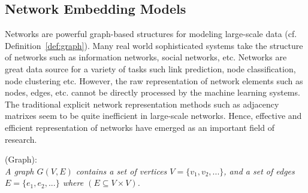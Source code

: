\subsection{Network Embedding Models}
\label{subsec:network_embedding_models}
Networks are powerful graph-based structures for modeling large-scale data (cf. Definition~\ref{def:graph}). Many real world sophisticated systems take the structure of networks such as information networks, social networks, etc. Networks are great data source for a variety of tasks such link prediction, node classification, node clustering etc. However, the raw representation of network elements such as nodes, edges, etc. cannot be directly processed by the machine learning systems. 
The traditional explicit network representation methods such as adjacency matrixes seem to be quite inefficient in large-scale networks. Hence, effective and efficient representation of  networks have emerged as an important field of research.

\begin{definition}{(Graph):\\}
\label{def:graph}
\textit{A graph $G(V, E)$ contains a set of vertices $V=\{v_1,v_2,...\}$, and a set of edges $E=\{e_1,e_2,...\}$ where  $(E  \subseteq V \times V)$.}
\end{definition}

